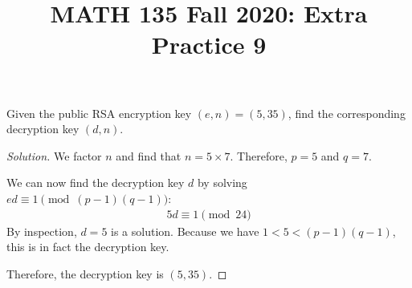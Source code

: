 \documentclass{agony}
\title{MATH 135 Fall 2020: Extra Practice 9}
\begin{document}
\thispagestyle{firstpage}

\textbf{\thetitle}


\question Given the public RSA encryption key $(e, n) = (5, 35)$,
find the corresponding decryption key $(d, n)$.
\begin{proof}[Solution]
  We factor $n$ and find that $n = 5 \times 7$.
  Therefore, $p=5$ and $q=7$.

  We can now find the decryption key $d$ by solving $ed \equiv 1 \pmod{(p-1)(q-1)}$:
  \begin{align*}
    5d \equiv 1 \pmod{24}
  \end{align*}
  By inspection, $d=5$ is a solution.
  Because we have $1 < 5 < (p-1)(q-1)$, this is in fact the decryption key.

  Therefore, the decryption key is $(5, 35)$.
\end{proof}


\end{document}

